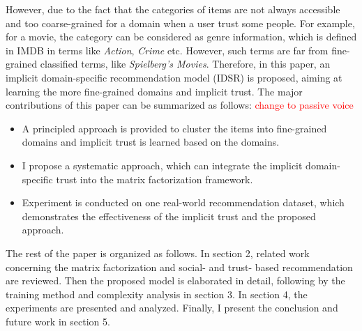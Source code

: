 However, due to the fact that the categories of items are not always accessible and too coarse-grained for a domain when a user trust some people. For example, for a movie, the category can be considered as genre information, which is defined in IMDB in terms like \emph{Action}, \emph{Crime} etc. However, such terms are far from fine-grained classified terms, like \emph{Spielberg's Movies}. Therefore, in this paper, an implicit domain-specific recommendation model (IDSR) is proposed, aiming at learning the more fine-grained domains and implicit trust. The major contributions of this paper can be summarized as follows:
\textcolor{red}{change to  passive voice}
\begin{itemize}
	\item A principled approach is provided to cluster the items into fine-grained domains and implicit trust is learned based on the domains.
	\item I propose a systematic approach, which can integrate the implicit domain-specific trust into the matrix factorization framework.
	\item Experiment is conducted on one real-world recommendation dataset, which demonstrates the effectiveness of the implicit trust and the proposed approach.
\end{itemize}

The rest of the paper is organized as follows. In section 2, related work concerning the matrix factorization and social- and trust- based recommendation are reviewed. Then the proposed model is elaborated in detail, following by the training method and complexity analysis in section 3. In section 4, the experiments are presented and analyzed. Finally, I present the conclusion and future work in section 5.


